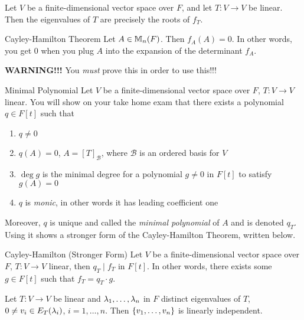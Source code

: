 \documentclass[class=article, crop=false]{standalone}
\begin{document}
  \begin{theorem}{14.3}
    Let $V$ be a finite-dimensional vector space over $F$, and let $T\colon V\to V$ be linear. Then the eigenvalues of $T$ are precisely the roots of $f_T$.
  \end{theorem}
  \begin{theorem}{Cayley-Hamilton Theorem}
    Let $A\in \mathbb{M}_n(F)$. Then $f_A(A) = 0$. In other words, you get $0$ when you plug $A$ into the expansion of the determinant $f_A$. \par
    \textbf{WARNING!!!} You \emph{must} prove this in order to use this!!!
  \end{theorem}
  \begin{definition}{Minimal Polynomial}
    Let $V$ be a finite-dimensional vector space over $F$, $T\colon V\to V$ linear. You will show on your take home exam that there exists a polynomial $q\in F[t]$ such that
    \begin{enumerate}[label=(\alph*)]
      \item $q\neq 0$
      \item $q(A) = 0$, $A = [T]_{\mathcal{B}}$, where $\mathcal{B}$ is an ordered basis for $V$
      \item $\deg g$ is the minimal degree for a polynomial $g\neq 0$ in $F[t]$ to satisfy $g(A) = 0$
      \item $q$ is \emph{monic}, in other words it has leading coefficient one
    \end{enumerate}
    Moreover, $q$ is unique and called the \emph{minimal polynomial} of $A$ and is denoted $q_T$. Using it shows a stronger form of the Cayley-Hamilton Theorem, written below.
  \end{definition}
  \begin{theorem}{Cayley-Hamilton (Stronger Form)}
    Let $V$ be a finite-dimensional vector space over $F$, $T\colon V\to V$ linear, then $q_T\mid f_T$ in $F[t]$. In other words, there exists some $g\in F[t]$ such that $f_T = q_T\cdot g$.
  \end{theorem}
  \begin{theorem}{}
    Let $T\colon V\to V$ be linear and $\lambda_1,\dotsc,\lambda_n$ in $F$ distinct eigenvalues of $T$, $0\neq v_i\in E_T(\lambda_i)$, $i = 1,\dotsc,n$. Then $\left\{v_1,\dotsc,v_n\right\}$ is linearly independent.
  \end{theorem}
\end{document}

